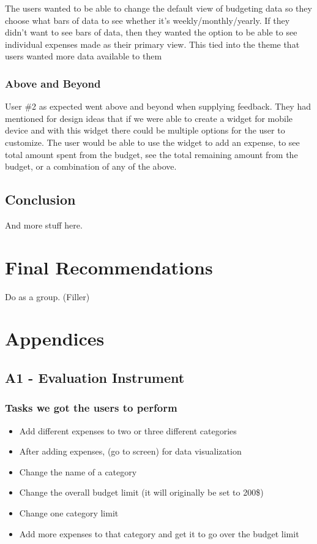 \documentclass{chi2011}
\begin{document}
	The users wanted to be able to change the default view of budgeting data so they choose
	what bars of data to see whether it's weekly/monthly/yearly. If they didn't want to see bars of
	data, then they wanted the option to be able to see individual expenses made as their primary 
	view. This tied into the theme that users wanted more data available to them 

	\subsubsection{Above and Beyond}
	
	User \#2 as expected went above and beyond when supplying feedback. They had mentioned for 
	design ideas that if we were able to create a widget for mobile device and with this widget
	there could be multiple options for the user to customize. The user would be able to use the 
	widget to add an expense, to see total amount spent from the budget, see the total remaining 
	amount from the budget, or a combination of any of the above. 

	\subsection{Conclusion}

	And more stuff here.

\section{Final Recommendations}

Do as a group. (Filler)

\section{Appendices}

	\subsection{A1 - Evaluation Instrument}
	
	\subsubsection{Tasks we got the users to perform}
	\begin{itemize}[noitemsep]
		\item Add different expenses to two or three different categories
		\item After adding expenses, (go to screen) for data visualization
		\item Change the name of a category
		\item Change the overall budget limit (it will originally be set to 200\$)
		\item Change one category limit
		\item Add more expenses to that category and get it to go over the budget limit
	\end{itemize}
		
\end{document}

